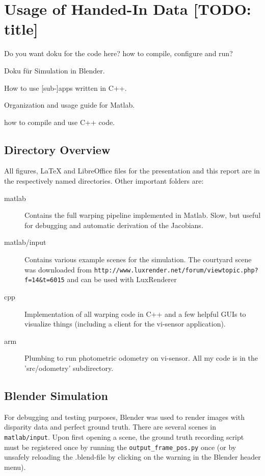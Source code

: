 \chapter{Usage of Handed-In Data [TODO: title]}
\label{sec:usage}

Do you want doku for the code here? how to compile, configure and run?

Doku für Simulation in Blender.

How to use [sub-]apps written in C++.

Organization and usage guide for Matlab.

how to compile and use C++ code.

\section{Directory Overview}

All figures, LaTeX and LibreOffice files for the presentation and this report
are in the respectively named directories. Other important folders are:

\begin{description}
    \item[matlab]
        Contains the full warping pipeline implemented in Matlab. Slow, but useful for debugging and automatic derivation of the Jacobians.
    \item[matlab/input]
        Contains various example scenes for the simulation.
        The courtyard scene was downloaded from \texttt{http://www.luxrender.net/forum/viewtopic.php?f=14\&t=6015} and can be used with LuxRenderer
    \item[cpp] Implementation of all warping code in C++ and a few helpful GUIs to visualize things (including a client for the vi-sensor application).
    \item[arm] Plumbing to run photometric odometry on vi-sensor. All my code is in the 'src/odometry' subdirectory.
\end{description}


\section{Blender Simulation}

For debugging and testing purposes, Blender was used to render images with
disparity data and perfect ground truth.  There are several scenes in
\texttt{matlab/input}. Upon first opening a scene, the ground truth
recording script must be registered once by running the
\texttt{output\_frame\_pos.py} once (or by unsafely reloading the .blend-file by
clicking on the warning in the Blender header menu).

